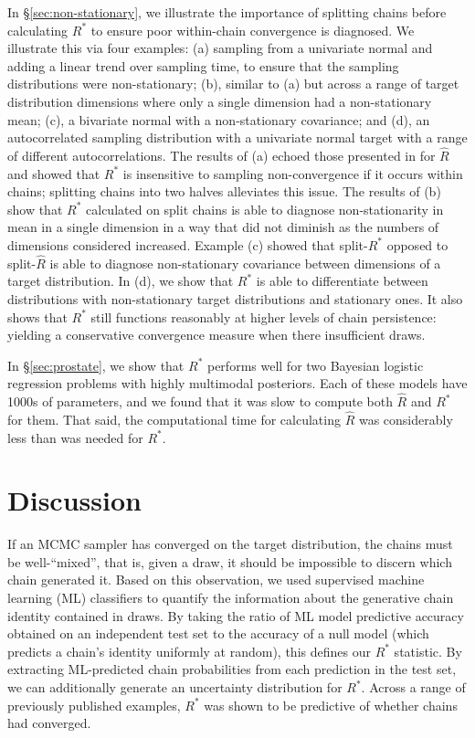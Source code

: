 \documentclass{article}
\begin{document}
In \S\ref{sec:non-stationary}, we illustrate the importance of splitting chains before calculating $R^*$ to ensure poor within-chain convergence is diagnosed. We illustrate this via four examples: (a) sampling from a univariate normal and adding a linear trend over sampling time, to ensure that the sampling distributions were non-stationary; (b), similar to (a) but across a range of target distribution dimensions where only a single dimension had a non-stationary mean; (c), a bivariate normal with a non-stationary covariance; and (d), an autocorrelated sampling distribution with a univariate normal target with a range of different autocorrelations. The results of (a) echoed those presented in \cite{vehtari2019rank} for $\widehat{R}$ and showed that $R^*$ is insensitive to sampling non-convergence if it occurs within chains; splitting chains into two halves alleviates this issue. The results of (b) show that $R^*$ calculated on split chains is able to diagnose non-stationarity in mean in a single dimension in a way that did not diminish as the numbers of dimensions considered increased. Example (c) showed that split-$R^*$ opposed to split-$\widehat{R}$ is able to diagnose non-stationary covariance between dimensions of a target distribution. In (d), we show that $R^*$ is able to differentiate between distributions with non-stationary target distributions and stationary ones. It also shows that $R^*$ still functions reasonably at higher levels of chain persistence: yielding a conservative convergence measure when there insufficient draws.

In \S\ref{sec:prostate}, we show that $R^*$ performs well for two Bayesian logistic regression problems with highly multimodal posteriors. Each of these models have 1000s of parameters, and we found that it was slow to compute both $\widehat{R}$ and $R^*$ for them. That said, the computational time for calculating $\widehat{R}$ was considerably less than was needed for $R^*$.


\section{Discussion}
If an MCMC sampler has converged on the target distribution, the chains must be well-``mixed'', that is, given a draw, it should be impossible to discern which chain generated it. Based on this observation, we used supervised machine learning (ML) classifiers to quantify the information about the generative chain identity contained in draws. By taking the ratio of ML model predictive accuracy obtained on an independent test set to the accuracy of a null model (which predicts a chain's identity uniformly at random), this defines our $R^*$ statistic. By extracting ML-predicted chain probabilities from each prediction in the test set, we can additionally generate an uncertainty distribution for $R^*$. Across a range of previously published examples, $R^*$ was shown to be predictive of whether chains had converged.
\end{document}
